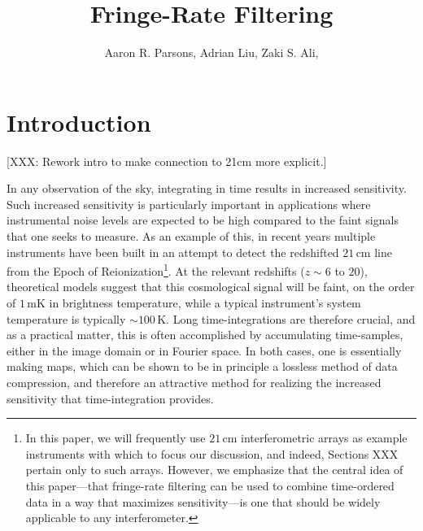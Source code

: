 \documentclass[twocolumn,apj,numberedappendix]{emulateapj}
\begin{document}
\title{Fringe-Rate Filtering}

\author{
Aaron R. Parsons,
Adrian Liu,
Zaki S. Ali,
}


\begin{abstract}
\end{abstract}




\section{Introduction}

[XXX: Rework intro to make connection to 21cm more explicit.]

In any observation of the sky, integrating in time results in increased sensitivity.  Such increased sensitivity is particularly important in applications where instrumental noise levels are expected to be high compared to the faint signals that one seeks to measure.  As an example of this, in recent years multiple instruments have been built in an attempt to detect the redshifted $21\,\textrm{cm}$ line from the Epoch of Reionization\footnote{In this paper, we will frequently use $21\,\textrm{cm}$ interferometric arrays as example instruments with which to focus our discussion, and indeed, Sections XXX pertain only to such arrays.  However, we emphasize that the central idea of this paper---that fringe-rate filtering can be used to combine time-ordered data in a way that maximizes sensitivity---is one that should be widely applicable to any interferometer.}.  At the relevant redshifts ($z\sim 6$ to $20$), theoretical models suggest that this cosmological signal will be faint, on the order of $1\,\textrm{mK}$ in brightness temperature, while a typical instrument's system temperature is typically $\sim 100\,\textrm{K}$.  Long time-integrations are therefore crucial, and as a practical matter, this is often accomplished by accumulating time-samples, either in the image domain or in Fourier space.  In both cases, one is essentially making maps, which can be shown to be in principle a lossless method of data compression, and therefore an attractive method for realizing the increased sensitivity that time-integration provides.
\end{document}
